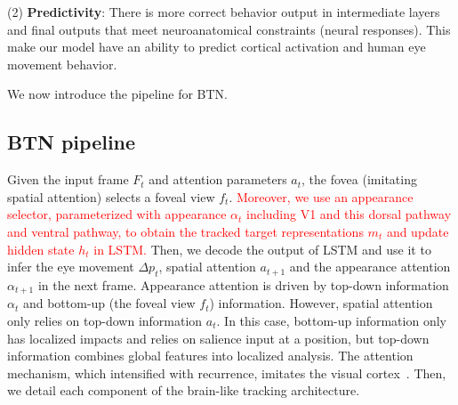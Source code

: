 \documentclass[final,3p,times,twocolumn]{elsarticle}
\begin{document}
(2) \textbf{Predictivity}: 
There is more correct behavior output in intermediate layers and final outputs that meet neuroanatomical constraints (neural responses). 
This make our model have an ability to predict cortical activation and human eye movement behavior.

We now introduce the pipeline for BTN. 


\subsection{BTN pipeline} \label{sec:cornet_s_def}

Given the input frame $F_t$ and attention parameters $a_t$, the fovea (imitating spatial attention) selects a foveal view $f_t$. 
\textcolor{red}{Moreover, we use an appearance selector, parameterized with appearance $\alpha _t$ including V1 and this dorsal pathway and ventral pathway, to obtain the tracked target representations $m_t$ 
and update hidden state $h_t$ in LSTM.}
Then, we decode the output of LSTM and use it to infer the eye movement $\Delta p_t$, spatial attention $a_{t+1}$ and the appearance attention $\alpha _{t+1}$ in the next frame.  
Appearance attention is driven by top-down information $\alpha _t$ and bottom-up (the foveal view $f_t$) information. 
However, spatial attention only relies on top-down information $a_t$.
In this case, bottom-up information only has localized impacts and relies on salience input at a position, 
but top-down information combines global features into localized analysis. 
The attention mechanism, which intensified with recurrence, imitates the visual cortex~\cite{attention}.
Then, we detail each component of the brain-like tracking architecture. 


\end{document}
